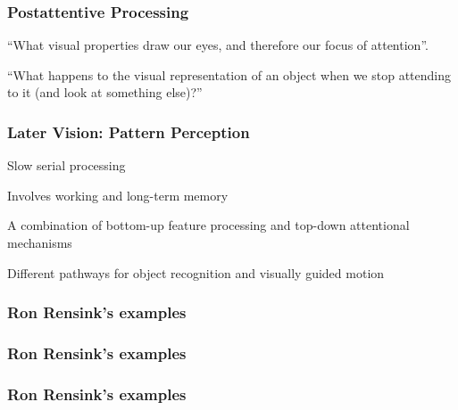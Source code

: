 \documentclass[12pt]{beamer}\usepackage[]{graphicx}\usepackage[]{color}
\begin{document}

\begin{frame}
\frametitle{Postattentive Processing}

``What visual properties draw our eyes,
and therefore our focus of attention''.
\eb

\vspace{1cm}

``What happens to the visual representation of
an object when we stop attending to it (and look at something else)?''
\eb

\end{frame}


\begin{frame}
\frametitle{Later Vision: Pattern Perception}

\bbi
  \item Slow serial processing
  \item Involves working and long-term memory
  \item A combination of bottom-up feature processing and top-down attentional
  mechanisms
  \item Different pathways for object recognition and visually guided motion
\ei

\end{frame}


\begin{frame}
\frametitle{Ron Rensink's examples}
\begin{center}
\end{center}
\end{frame}


\begin{frame}
\frametitle{Ron Rensink's examples}
\begin{center}
\end{center}
\end{frame}


\begin{frame}
\frametitle{Ron Rensink's examples}
\begin{center}
\end{center}
\end{frame}
\end{document}
